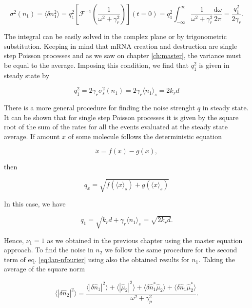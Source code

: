\begin{equation}
  \label{eq:lan-qrel1}
  \sigma^2(n_1) = \langle\delta n_1^2\rangle = q_1^2 \left[\mathscr{F}^{-1}\left(\frac{1}{\omega^2+\gamma_r^2}\right)\right](t=0) = q_1^2\int_{-\infty}^\infty\frac{1}{\omega^2+\gamma_r^2}\frac{\mathrm{d}\omega}{2\pi} = \frac{q_1^2}{2\gamma_r}.
\end{equation}

The integral can be easily solved in the complex plane or by trigonometric substitution. Keeping in mind that mRNA creation and destruction are single step Poisson processes and as we saw on chapter \ref{ch:master}, the variance must be equal to the average. Imposing this condition, we find that $q_1^2$ is given in steady state by

\begin{equation*}
  q_1^2 = 2\gamma_r\sigma_s^2(n_1) = 2\gamma_r\langle n_1\rangle_s = 2k_rd
\end{equation*}

There is a more general procedure for finding the noise strenght $q$ in steady state. It can be shown that for single step Poisson processes it is given by the square root of the sum of the rates for all the events evaluated at the steady state average. If amount $x$ of some molecule follows the deterministic equation

\begin{equation*}
  \dot{x} = f(x) - g(x),
\end{equation*}

then

\begin{equation}
  \label{eq:lan-q_form}
  q_x = \sqrt{f(\langle x\rangle_s)+g(\langle x\rangle_s)}
\end{equation}

In this case, we have

\begin{equation*}
  q_1 = \sqrt{k_rd + \gamma_r\langle n_1\rangle_s} = \sqrt{2k_rd}.
\end{equation*}

Hence, $\nu_1 = 1$ as we obtained in the previous chapter using the master equation approach. To find the noise in $n_2$ we follow the same procedure for the second term of eq. \eqref{eq:lan-nfourier} using also the obtained results for $n_1$. Taking the average of the square norm

\begin{equation*}
  \langle|\delta\hat{n}_2|^2\rangle = \frac{\langle|\delta\hat{n}_1|^2\rangle + \langle|\hat{\mu}_2|^2\rangle + \langle \delta\hat{n}_1^* \hat{\mu}_2\rangle +\langle \delta\hat{n}_1 \hat{\mu}_2^*\rangle}{\omega^2+\gamma_p^2}.
\end{equation*}
  
